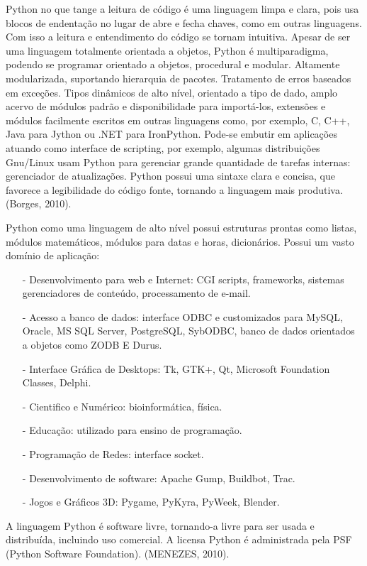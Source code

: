 Python no que tange a leitura de código é uma linguagem limpa e clara, pois usa blocos de endentação no lugar de abre e fecha chaves, como em outras linguagens. Com isso a leitura e entendimento do código se tornam intuitiva. Apesar de ser uma linguagem totalmente orientada a objetos, Python é multiparadigma, podendo se programar orientado a objetos, procedural e modular. Altamente modularizada, suportando hierarquia de pacotes. Tratamento de erros baseados em exceções. Tipos dinâmicos de alto nível, orientado a tipo de dado, amplo acervo de módulos padrão e disponibilidade para importá-los, extensões e módulos facilmente escritos em outras linguagens como, por exemplo, C, C++, Java para Jython ou .NET para IronPython. Pode-se embutir em aplicações atuando como interface de scripting, por exemplo, algumas distribuições Gnu/Linux usam Python para gerenciar grande quantidade de tarefas internas: gerenciador de atualizações. Python possui uma sintaxe clara e concisa, que favorece a legibilidade do código fonte, tornando a linguagem mais produtiva. (Borges, 2010).

Python como uma linguagem de alto nível possui estruturas prontas como listas, módulos matemáticos, módulos para datas e horas, dicionários. Possui um vasto domínio de aplicação:

\begin{itemize}
	\item[-] Desenvolvimento para web e Internet: CGI scripts, frameworks, sistemas gerenciadores de conteúdo, processamento de e-mail.
	\item[-] Acesso a banco de dados: interface ODBC e customizados para MySQL, Oracle, MS SQL Server, PostgreSQL, SybODBC, banco de dados orientados a objetos como ZODB E Durus.
	\item[-] Interface Gráfica de Desktops: Tk, GTK+, Qt, Microsoft Foundation Classes, Delphi.
	\item[-] Cientifico e Numérico: bioinformática, física.
	\item[-] Educação: utilizado para ensino de programação.
	\item[-] Programação de Redes: interface socket. 
	\item[-] Desenvolvimento de software: Apache Gump, Buildbot, Trac.
	\item[-] Jogos e Gráficos 3D: Pygame, PyKyra, PyWeek, Blender.	
\end{itemize}
 
A linguagem Python é software livre, tornando-a livre para ser usada e distribuída, incluindo uso comercial. A licensa Python é administrada pela PSF (Python Software Foundation). (MENEZES, 2010).


